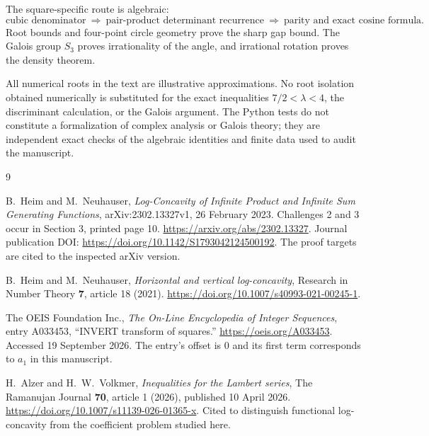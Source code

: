 \documentclass[11pt,letterpaper]{article}
\theoremstyle{definition}
\numberwithin{equation}{section}
\begin{document}
The square-specific route is algebraic:
\[
\text{cubic denominator}
\ \Longrightarrow\ \text{pair-product determinant recurrence}
\ \Longrightarrow\ \text{parity and exact cosine formula}.
\]
Root bounds and four-point circle geometry prove the sharp gap bound.
The Galois group $S_3$ proves irrationality of the angle, and irrational
rotation proves the density theorem.

All numerical roots in the text are illustrative approximations.
No root isolation obtained numerically is substituted for the exact
inequalities $7/2<\lambda<4$, the discriminant calculation, or the
Galois argument. The Python tests do not constitute a formalization of
complex analysis or Galois theory; they are independent exact checks of
the algebraic identities and finite data used to audit the manuscript.

\begin{thebibliography}{9}

B.~Heim and M.~Neuhauser,
\emph{Log-Concavity of Infinite Product and Infinite Sum Generating Functions},
arXiv:2302.13327v1, 26 February 2023.
Challenges 2 and 3 occur in Section 3, printed page 10.
\url{https://arxiv.org/abs/2302.13327}.
Journal publication DOI: \url{https://doi.org/10.1142/S1793042124500192}.
The proof targets are cited to the inspected arXiv version.

B.~Heim and M.~Neuhauser,
\emph{Horizontal and vertical log-concavity},
Research in Number Theory \textbf{7}, article 18 (2021).
\url{https://doi.org/10.1007/s40993-021-00245-1}.

The OEIS Foundation Inc.,
\emph{The On-Line Encyclopedia of Integer Sequences}, entry A033453,
``INVERT transform of squares.''
\url{https://oeis.org/A033453}.
Accessed 19 September 2026. The entry's offset is $0$ and its first
term corresponds to $a_1$ in this manuscript.

H.~Alzer and H.~W.~Volkmer,
\emph{Inequalities for the Lambert series},
The Ramanujan Journal \textbf{70}, article 1 (2026), published 10 April 2026.
\url{https://doi.org/10.1007/s11139-026-01365-x}.
Cited to distinguish functional log-concavity from the coefficient
problem studied here.

\end{thebibliography}
\end{document}
